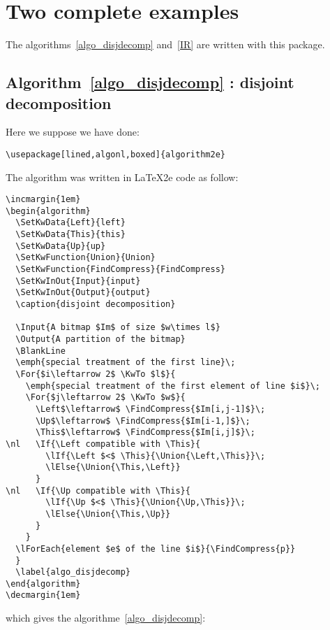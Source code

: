 \documentclass[a4paper]{article}
\begin{document}
\clearpage
\section{Two complete examples}\label{longexample}


The algorithms~\ref{algo_disjdecomp} and~\ref{IR} are written with this package.

\subsection{Algorithm~\protect\ref{algo_disjdecomp} : disjoint decomposition}

Here we suppose we have done:
\begin{verbatim}
\usepackage[lined,algonl,boxed]{algorithm2e}
\end{verbatim}

\noindent The algorithm was written in \LaTeX2e code as follow:
\begin{samepage}
\begin{verbatim}
\incmargin{1em}
\begin{algorithm}
  \SetKwData{Left}{left}
  \SetKwData{This}{this}
  \SetKwData{Up}{up}
  \SetKwFunction{Union}{Union}
  \SetKwFunction{FindCompress}{FindCompress}
  \SetKwInOut{Input}{input}
  \SetKwInOut{Output}{output}
  \caption{disjoint decomposition}

  \Input{A bitmap $Im$ of size $w\times l$}
  \Output{A partition of the bitmap}
  \BlankLine
  \emph{special treatment of the first line}\;
  \For{$i\leftarrow 2$ \KwTo $l$}{
    \emph{special treatment of the first element of line $i$}\;
    \For{$j\leftarrow 2$ \KwTo $w$}{
      \Left$\leftarrow$ \FindCompress{$Im[i,j-1]$}\;
      \Up$\leftarrow$ \FindCompress{$Im[i-1,]$}\;
      \This$\leftarrow$ \FindCompress{$Im[i,j]$}\;
\nl   \If{\Left compatible with \This}{
        \lIf{\Left $<$ \This}{\Union{\Left,\This}}\;
        \lElse{\Union{\This,\Left}}
      }
\nl   \If{\Up compatible with \This}{
        \lIf{\Up $<$ \This}{\Union{\Up,\This}}\;
        \lElse{\Union{\This,\Up}}
      }
    }
  \lForEach{element $e$ of the line $i$}{\FindCompress{p}}
  }
  \label{algo_disjdecomp}
\end{algorithm}
\decmargin{1em}
\end{verbatim}
\end{samepage}

\noindent which gives the algorithme~\vref{algo_disjdecomp}:
\end{document}
